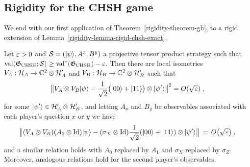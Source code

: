 \subsection{Rigidity for the CHSH game}
\label{subsection-chsh-rigid}

We end with our first application of Theorem~\ref{rigidity-theorem-gh}, to a rigid extension of Lemma~\ref{rigidity-lemma-rigid-chsh-exact}.

\begin{theorem}\label{theorem-rigid-chsh}
Let $\varepsilon>0$ and $\mathcal{S} = (|\psi\rangle,A^x,B^y)$ a projective tensor product strategy such that $\mathrm{val}(\mathfrak{G}_{\mathrm{CHSH}};\mathcal{S})\geq\mathrm{val}^*(\mathfrak{G}_{\mathrm{CHSH}})-\varepsilon$. Then there are local isometries $V_A:\mathcal{H}_A \to \mathbb{C}^2 \otimes \mathcal{H}'_A$ and $V_B:\mathcal{H}_B \to \mathbb{C}^2 \otimes \mathcal{H}'_B$  such that 
\begin{equation}\label{equation-chsh-state}
\big\| V_A \otimes V_B |\psi\rangle - \frac{1}{\sqrt{2}}\big(|00\rangle+|11\rangle\big) \otimes |\psi'\rangle \big\|^2 = O(\sqrt{\varepsilon}) \;,
\end{equation}
for some $|\psi'\rangle\in \mathcal{H}_A'\otimes \mathcal{H}_B'$, and letting $A_x$ and $B_y$ be observables associated with each player's question $x$ or $y$ we have
\begin{equation}\label{equation-chsh-alice}
\big\|( V_A \otimes V_B)( A_0 \otimes \mathop{\rm Id}\nolimits )|\psi\rangle - (\sigma_X \otimes \mathop{\rm Id}\nolimits)\frac{1}{\sqrt{2}}(|00\rangle+|11\rangle) \otimes |\psi'\rangle \big\| \,=\, O\big(\sqrt{\varepsilon}\big)\;,
\end{equation}
and a similar relation holds with $A_0$ replaced by $A_1$ and $\sigma_X$ replaced by $\sigma_Z$. Moreover, analogous relations hold for the second player's observables. 
\end{theorem}

